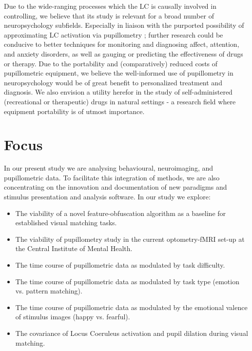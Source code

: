 	Due to the wide-ranging processes which the LC is causally involved in controlling, we believe that its study is relevant for a broad number of neuropsychology subfields.
	Especially in liaison with the purported possibility of approximating LC activation via pupillometry \citep{Gilzenrat2010,Murphy2011}; further research could be conducive to better techniques for monitoring and diagnosing affect, attention, and anxiety disorders, as well as gauging or predicting the effectiveness of drugs or therapy.
	Due to the portability \citep{Bradley2010} and (comparatively) reduced costs of pupillometric equipment, we believe the well-informed use of pupillometry in neuropsychology would be of great benefit to personalized treatment and diagnosis.
	We also envision a utility herefor in the study of self-administered (recreational or therapeutic) drugs in natural settings - a research field where equipment portability is of utmost importance.
    \section{Focus}\label{sec:b_f}
	In our present study we are analysing behavioural, neuroimaging, and pupillometric data.
	To facilitate this integration of methods, we are also concentrating on the innovation and documentation of new paradigms and stimulus presentation and analysis software.
	In our study we explore:
	\begin{itemize}
	    \item The viability of a novel feature-obfuscation algorithm as a baseline for established visual matching tasks.
	    \item The viability of pupillometry study in the current optometry-fMRI set-up at the Central Institute of Mental Health.
	    \item The time course of pupillometric data as modulated by task difficulty.
	    \item The time course of pupillometric data as modulated by task type (emotion vs. pattern matching).
	    \item The time course of pupillometric data as modulated by the emotional valence of stimulus images (happy vs. fearful).
	    \item The covariance of Locus Coeruleus activation and pupil dilation during visual matching.
	\end{itemize}
	
